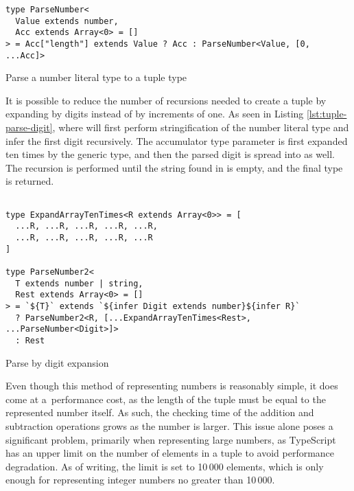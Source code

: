 \begin{listing}[ht]
  \begin{verbatim}
type ParseNumber<
  Value extends number,
  Acc extends Array<0> = []
> = Acc["length"] extends Value ? Acc : ParseNumber<Value, [0, ...Acc]>
\end{verbatim}
  \caption{Parse a number literal type to a tuple type}\label{lst:tuple-parse}
\end{listing}

It is possible to reduce the number of recursions needed to create a tuple by expanding by digits instead of by increments of one. As seen in Listing \ref{lst:tuple-parse-digit}, where  will first perform stringification of the number literal type  and infer the first digit recursively. The accumulator type parameter  is first expanded ten times by the  generic type, and then the parsed digit is spread into  as well. The recursion is performed until the string found in  is empty, and the final  type is returned.

\begin{listing}[ht]
  \begin{verbatim}

type ExpandArrayTenTimes<R extends Array<0>> = [
  ...R, ...R, ...R, ...R, ...R,
  ...R, ...R, ...R, ...R, ...R
]
    
type ParseNumber2<
  T extends number | string,
  Rest extends Array<0> = []
> = `${T}` extends `${infer Digit extends number}${infer R}`
  ? ParseNumber2<R, [...ExpandArrayTenTimes<Rest>, ...ParseNumber<Digit>]>
  : Rest
\end{verbatim}
  \caption{Parse by digit expansion}\label{lst:tuple-parse-digit}
\end{listing}

Even though this method of representing numbers is reasonably simple, it does come at a~performance cost, as the length of the tuple must be equal to the represented number itself. As such, the checking time of the addition and subtraction operations grows as the number is larger. This issue alone poses a significant problem, primarily when representing large numbers, as TypeScript has an upper limit on the number of elements in a tuple to avoid performance degradation. As of writing, the limit is set to 10\,000 elements\cite{ImplementationCheckerTs2023}, which is only enough for representing integer numbers no greater than 10\,000.

\clearpage

